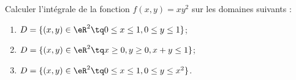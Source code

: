 
\begin{exercice}\label{exoOutilsMath-0101}

    Calculer l'intégrale de la fonction $f(x,y)=xy^2$ sur les domaines suivants :
    \begin{enumerate}
        \item
            $D=\{ (x,y)\in\eR^2\tq 0\leq x\leq 1, 0\leq y\leq 1 \}$;
        \item
            $D=\{ (x,y)\in\eR^2\tq x\geq 0,y\geq 0,x+y\leq 1 \}$;
        \item
            $D=\{ (x,y)\in\eR^2\tq 0\leq x\leq 1,0\leq y\leq x^2 \}$.
    \end{enumerate}

\end{exercice}
